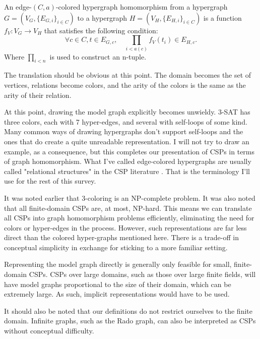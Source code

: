 \begin{definition}
An edge-$(C, a)$-colored hypergraph homomorphism from a hypergraph $G = (V_G, \{E_{G,i}\}_{i\in C})$ to a hypergraph $H = (V_H, \{E_{H, i}\}_{i\in C})$ is a function $f_V: V_G \rightarrow V_H$ that satisfies the following condition:
\begin{equation}
    \forall c \in C, t \in E_{G, c}, \quad \prod_{i<a(c)} f_V(t_i) \in E_{H, c}.    
\end{equation}
Where $\prod_{i<n}$ is used to construct an n-tuple.
\end{definition}

The translation should be obvious at this point. The domain becomes the set of vertices, relations become colors, and the arity of the colors is the same as the arity of their relation.

At this point, drawing the model graph explicitly becomes unwieldy. 3-SAT has three colors, each with 7 hyper-edges, and several with self-loops of some kind. Many common ways of drawing hypergraphs don't support self-loops and the ones that do create a quite unreadable representation. I will not try to draw an example, as a consequence, but this completes our presentation of CSPs in terms of graph homomorphism. What I've called edge-colored hypergraphs are usually called "relational structures" in the CSP literature \citep{feder1998computational}. That is the terminology I'll use for the rest of this survey.

\begin{remark}\label{remark:just-graphs}
It was noted earlier that 3-coloring is an NP-complete problem. It was also noted that all finite-domain CSPs are, at most, NP-hard. This means we can translate all CSPs into graph homomorphism problems efficiently, eliminating the need for colors or hyper-edges in the process. However, such representations are far less direct than the colored hyper-graphs mentioned here. There is a trade-off in conceptual simplicity in exchange for sticking to a more familiar setting.
\end{remark}

Representing the model graph directly is generally only feasible for small, finite-domain CSPs. CSPs over large domains, such as those over large finite fields, will have model graphs proportional to the size of their domain, which can be extremely large. As such, implicit representations would have to be used.

It should also be noted that our definitions do not restrict ourselves to the finite domain. Infinite graphs, such as the Rado graph, can also be interpreted as CSPs without conceptual difficulty.